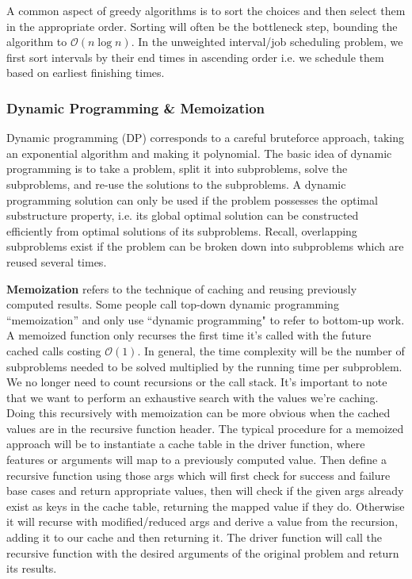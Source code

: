 \documentclass{article}
\newcommand{\bigO}{\mathcal{O}}
\begin{document}
    A common aspect of greedy algorithms is to sort the choices and then select them in the appropriate order. Sorting will often be the bottleneck step, bounding the algorithm to $\bigO(n \log n)$. In the unweighted interval/job scheduling problem, we first sort intervals by their end times in ascending order i.e. we schedule them based on earliest finishing times.  
    
    \subsubsection{Dynamic Programming \& Memoization}
    Dynamic programming (DP) corresponds to a careful bruteforce approach, taking an exponential algorithm and making it polynomial. The basic idea of dynamic programming is to take a problem, split it into subproblems, solve the subproblems, and re-use the solutions to the subproblems. A dynamic programming solution can only be used if the problem possesses the optimal substructure property, i.e. its global optimal solution can be constructed efficiently from optimal solutions of its subproblems. Recall, overlapping subproblems exist if the problem can be broken down into subproblems which are reused several times. 
    
    \textbf{Memoization} refers to the technique of caching and reusing previously computed results. Some people call top-down dynamic programming ``memoization'' and only use ``dynamic programming" to refer to bottom-up work. A memoized function only recurses the first time it's called with the future cached calls costing $\bigO(1)$. In general, the time complexity will be the number of subproblems needed to be solved multiplied by the running time per subproblem. We no longer need to count recursions or the call stack. It's important to note that we want to perform an exhaustive search with the values we're caching. Doing this recursively with memoization can be more obvious when the cached values are in the recursive function header. The typical procedure for a memoized approach will be to instantiate a cache table in the driver function, where features or arguments will map to a previously computed value. Then define a recursive function using those args which will first check for success and failure base cases and return appropriate values, then will check if the given args already exist as keys in the cache table, returning the mapped value if they do. Otherwise it will recurse with modified/reduced args and derive a value from the recursion, adding it to our cache and then returning it. The driver function will call the recursive function with the desired arguments of the original problem and return its results.
    
\end{document}

